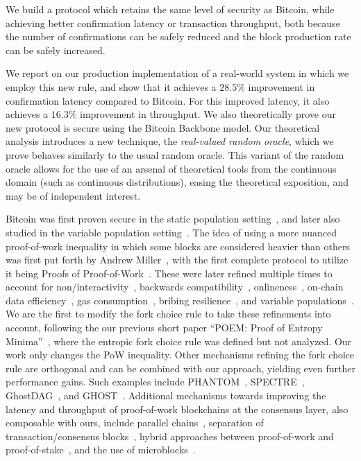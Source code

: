 \noindent
{}
We build a protocol which retains the same level of security as Bitcoin, while achieving
better confirmation latency or transaction throughput, both because the number of confirmations
can be safely reduced and the block production rate can be safely increased.

We report on our production implementation of a real-world system
in which we employ this new rule, and show that it achieves a $28.5\%$
improvement in confirmation latency compared to Bitcoin. For this improved
latency, it also achieves a $16.3\%$ improvement in throughput.
We also theoretically prove our new protocol is secure
using the Bitcoin Backbone model. Our theoretical analysis introduces
a new technique, the \emph{real-valued random oracle}, which we prove behaves
similarly to the usual random oracle. This variant of the
random oracle allows for the use of an arsenal of theoretical tools from the
continuous domain (such as continuous distributions), easing the theoretical
exposition, and may be of independent interest.

\noindent
{}
Bitcoin was first proven secure in the static population setting~\cite{backbone},
and later also studied in the variable population setting~\cite{varbackbone}.
The idea of using a more nuanced proof-of-work inequality in which some blocks
are considered heavier than others was first put forth by Andrew Miller~\cite{highway},
with the first complete protocol to utilize it being
Proofs of Proof-of-Work~\cite{popow}. These were later refined multiple times
to account for non\-/interactivity~\cite{nipopows}, backwards compatibility~\cite{velvet-nipopows},
onlineness~\cite{logspace}, on-chain data efficiency~\cite{compact-superblocks},
gas consumption~\cite{gasefficient-nipopows},
bribing resilience~\cite{soft-power},
and variable populations~\cite{dionyziz}.
We are the first to modify the fork choice rule to take these refinements into
account, following \ifanonymous
the
\else
our
\fi
previous short paper ``POEM: Proof of Entropy Minima''~\cite{poem-short},
where the entropic fork choice rule was defined but not analyzed.
Our work only changes the PoW inequality.
Other mechanisms refining the fork choice rule
are orthogonal and can be combined with our approach, yielding even
further performance gains.
Such examples include
PHANTOM~\cite{phantom}, SPECTRE~\cite{spectre}, GhostDAG~\cite{ghostdag}, and
GHOST~\cite{ghost}.
Additional mechanisms towards improving the latency and throughput
of proof-of-work blockchains at the consensus
layer, also composable with ours, include parallel chains~\cite{parallel-chains},
separation of transaction/consensus blocks~\cite{prism},
hybrid approaches between proof-of-work and proof-of-stake~\cite{byzcoin},
and the use of microblocks~\cite{bitcoin-ng}.